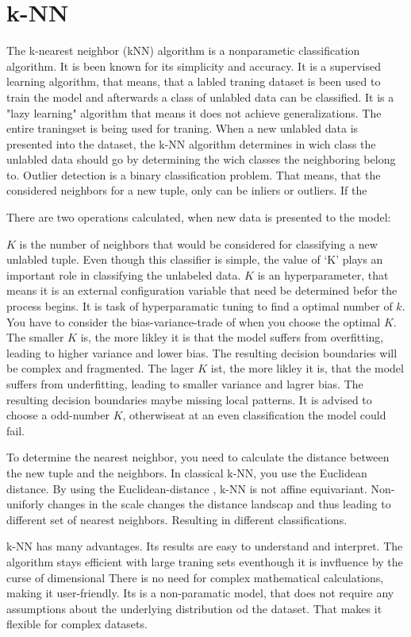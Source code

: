 \section{k-NN}
The k-nearest neighbor (kNN) algorithm is a nonparametic classification algorithm. It is been known for its simplicity and accuracy.
It is a supervised learning algorithm, that means, that a labled traning dataset is been used to train the model and afterwards a class of unlabled data can be classified.
It is a "lazy learning" algorithm that means it does not achieve generalizations. The entire traningset is being used for traning.
When a new unlabled data is presented into the dataset, the k-NN algorithm determines in wich class the unlabled data should go by determining the wich classes the neighboring belong to.
Outlier detection is a binary classification problem. That means, that the considered neighbors for a new tuple, only can be inliers or outliers. 
If the 


There are two operations calculated, when new data is presented to the model:
\citep[p.1256 pp.]{9065747}


$K$ is the number of neighbors that would be considered for classifying a new unlabled tuple. 
Even though this classifier is simple, the value of ‘K’ plays an important role in classifying the unlabeled data.
$K$ is an hyperparameter, that means it is an external configuration variable that need be determined befor the process begins.
It is task of hyperparamatic tuning to find a optimal number of $k$. 
You have to consider the bias-variance-trade of when you choose the optimal $K$. 
The smaller $K$ is, the more likley it is that the model suffers from overfitting, leading to higher variance and lower bias.
The resulting decision boundaries will be complex and fragmented.
The lager $K$ ist, the more likley it is, that the model suffers from underfitting, leading to smaller variance and lagrer bias.
The resulting decision boundaries maybe missing local patterns.
It is advised to choose a odd-number $K$, otherwiseat at an even classification the model could fail.  


To determine the nearest neighbor, you need to calculate the distance between the new tuple and the neighbors. 
In classical k-NN, you use the Euclidean distance. 
By using the Euclidean-distance , k-NN is not affine equivariant.
Non-uniforly changes in the scale changes the distance landscap and thus leading to different set of nearest neighbors.
Resulting in different classifications. 


k-NN has many advantages. Its results are easy to understand and interpret.
The algorithm stays efficient with large traning sets eventhough it is invfluence by the curse of dimensional
There is no need for complex mathematical calculations, making it user-friendly.
Its is a non-paramatic model, that does not require any assumptions about the underlying distribution od the dataset.
That makes it flexible for complex datasets.


